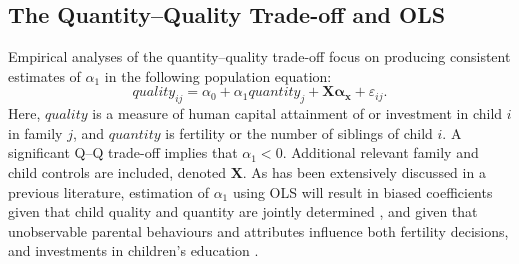 \documentclass[subeqn]{article}
\begin{document}
\begin{spacing}{1.4}
\subsection{The Quantity--Quality Trade-off and OLS}
\label{sscn:OLS}
Empirical analyses of the quantity--quality trade-off focus on producing
consistent estimates of $\alpha_1$ in the following population equation:
\begin{equation}
  \label{TWINeqn:RF}
  quality_{ij}=\alpha_0+\alpha_1 quantity_{j} + \bm{X}\bm{\alpha_x}+\varepsilon_{ij}.
\end{equation}
Here, $quality$ is a measure of human capital attainment of or investment in child
$i$ in family $j$, and $quantity$ is fertility or the number of siblings of child 
$i$. %
A significant Q--Q trade-off implies that $\alpha_1<0$. Additional relevant family and child controls are included, denoted $\bm{X}$.
As has been extensively discussed in a previous literature, estimation of $\alpha_1$
using OLS %
will result in biased coefficients given that
child quality and quantity are jointly determined \citep{BeckerLewis1973,
  BeckerTomes1976}, and given that unobservable parental behaviours and attributes
influence both fertility decisions, and investments in children's education
\citep{Qian2009}. %


\end{spacing}
\end{document}

